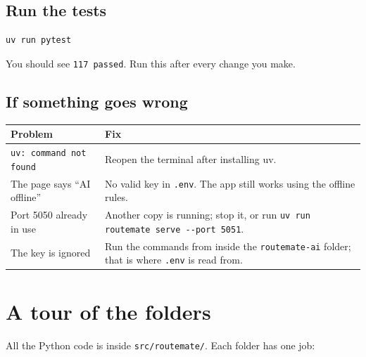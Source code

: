 \documentclass[11pt,a4paper]{article}
\newcommand{\file}[1]{\texttt{\color{accent}#1}}
\begin{document}
\subsection{Run the tests}
\begin{lstlisting}[style=shell]
uv run pytest
\end{lstlisting}
You should see \texttt{117 passed}. Run this after every change you make.

\subsection{If something goes wrong}
\begin{tabularx}{\linewidth}{@{}>{\raggedright\arraybackslash}p{5.2cm} X@{}}
\toprule
\textbf{Problem} & \textbf{Fix} \\
\midrule
\texttt{uv: command not found} & Reopen the terminal after installing uv. \\
The page says ``AI offline'' & No valid key in \texttt{.env}. The app still works using the offline rules. \\
Port 5050 already in use & Another copy is running; stop it, or run \texttt{uv run routemate serve -{}-port 5051}. \\
The key is ignored & Run the commands from inside the \texttt{routemate-ai} folder; that is where \texttt{.env} is read from. \\
\bottomrule
\end{tabularx}

\section{A tour of the folders}

All the Python code is inside \file{src/routemate/}. Each folder has one job:
\end{document}

